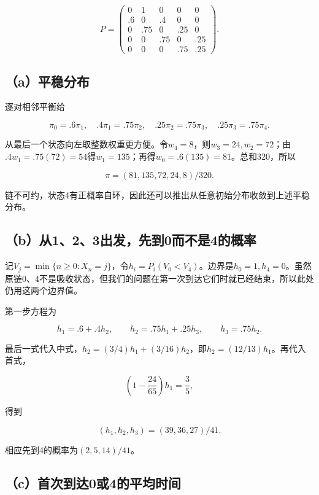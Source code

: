 \documentclass[
  11pt,
  a4paper,
  UTF8,
  fontset=fandol]{ctexart}
\begin{document}
\[
P=\begin{pmatrix}
0&1&0&0&0\\.6&0&.4&0&0\\0&.75&0&.25&0\\0&0&.75&0&.25\\0&0&0&.75&.25
\end{pmatrix}.
\]

\subsection{（a）平稳分布}\label{aux5e73ux7a33ux5206ux5e03}

逐对相邻平衡给

\[
\pi_0=.6\pi_1,\quad
.4\pi_1=.75\pi_2,\quad
.25\pi_2=.75\pi_3,\quad
.25\pi_3=.75\pi_4.
\]

从最后一个状态向左取整数权重更方便。令\(w_4=8\)，则\(w_3=24,w_2=72\)；由\(.4w_1=.75(72)=54\)得\(w_1=135\)；再得\(w_0=.6(135)=81\)。总和320，所以

\[
\boxed{\pi=(81,135,72,24,8)/320.}
\]

链不可约，状态4有正概率自环，因此还可以推出从任意初始分布收敛到上述平稳分布。

\subsection{（b）从1、2、3出发，先到0而不是4的概率}\label{bux4ece123ux51faux53d1ux5148ux52300ux800cux4e0dux662f4ux7684ux6982ux7387}

记\(V_j=\min\{n\ge0:X_n=j\}\)，令\(h_i=P_i(V_0<V_4)\)。边界是\(h_0=1,h_4=0\)。虽然原链0、4不是吸收状态，但我们的问题在第一次到达它们时就已经结束，所以此处仍用这两个边界值。

第一步方程为

\[
h_1=.6+.4h_2,\qquad
h_2=.75h_1+.25h_3,\qquad
h_3=.75h_2.
\]

最后一式代入中式，\(h_2=(3/4)h_1+(3/16)h_2\)，即\(h_2=(12/13)h_1\)。再代入首式，

\[
\left(1-\frac{24}{65}\right)h_1=\frac35,
\]

得到

\[
\boxed{(h_1,h_2,h_3)=(39,36,27)/41.}
\]

相应先到4的概率为\((2,5,14)/41\)。

\subsection{（c）首次到达0或4的平均时间}\label{cux9996ux6b21ux5230ux8fbe0ux62164ux7684ux5e73ux5747ux65f6ux95f4}
\end{document}
